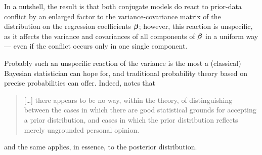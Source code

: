 In a nutshell, the result is that both conjugate models do react
to prior-data conflict by an enlarged factor to the variance-covariance matrix
of the distribution on the regression coefficients $\boldsymbol{\beta}$; however, this reaction is unspecific, as it affects the
variance and covariances of all components of $\boldsymbol{\beta}$ in a uniform way
--- even if the conflict occurs only in one single component.

Probably such an unspecific reaction of the variance is the most a (classical)
Bayesian statistician can hope for, and traditional probability theory based on precise probabilities can offer.
Indeed, \textcite{1987:kyburg:ess} notes that
\begin{quotation}
\begin{small}
[\ldots] there appears to be no way, within the theory, of
distinguishing between the cases in which there are good statistical grounds
for accepting a prior distribution, and cases in which the prior distribution
reflects merely ungrounded personal opinion.%
\end{small}
\end{quotation}
and the same applies, in essence, to the posterior distribution.

